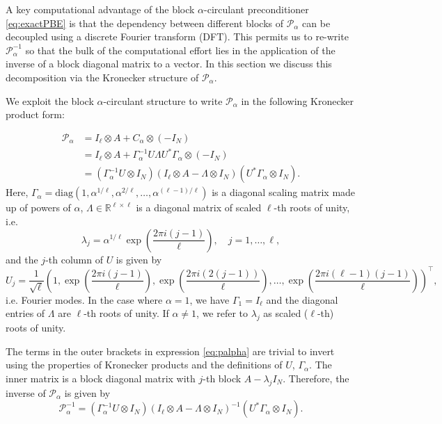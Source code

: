 \documentclass{article}
\newcommand{\sizeA}{N}
\theoremstyle{definition}
\begin{document}
	A key computational advantage of the block $\alpha$-circulant preconditioner \eqref{eq:exactPBE} is that the dependency between different blocks of $\mathcal{P}_\alpha$ can be decoupled using a discrete Fourier transform (DFT). This permits us to re-write $\mathcal{P}_\alpha^{-1}$ so that the bulk of the computational effort lies in the application of the inverse of a block diagonal matrix to a vector. In this section we discuss this decomposition via the Kronecker structure of $\mathcal{P}_\alpha$.
	
	We exploit the block {$\alpha$-}circulant structure to write $\mathcal{P}_{\alpha}$
	in the following Kronecker product form:
	{
		\begin{align}
			\nonumber
			\mathcal{P}_{\alpha} &= I_{\ell} \otimes {A} + C_{\alpha} \otimes(-I_\sizeA)\\
			\nonumber
			& = I_{\ell} \otimes {A} + \Gamma_{\alpha}^{-1}U\Lambda U^*\Gamma_{\alpha} \otimes(-I_\sizeA)\\
			& = (\Gamma_{\alpha}^{-1}U\otimes I_\sizeA) (I_{\ell}\otimes {A} - \Lambda \otimes I_\sizeA)(U^*\Gamma_{\alpha}\otimes I_\sizeA).
			\label{eq:palpha}
		\end{align}
		Here, $\Gamma_{\alpha} = \textrm{diag}(1,\alpha^{1/\ell},\alpha^{2/\ell},\dots,\alpha^{(\ell-1)/\ell})$ is a diagonal scaling matrix made up of powers of $\alpha$, $\Lambda \in \mathbb{R}^{\ell\times \ell}$ is a diagonal matrix of scaled {$\ell$-th} roots of unity, i.e. 
		\begin{equation*}
			\lambda_j = \alpha^{1/\ell}\exp \left(\frac{2\pi i (j-1)}{\ell}\right), {\quad j=1, \ldots, \ell},
		\end{equation*}
		and the $j$-th column of $U$ is given by 
		$$U_j = \frac{1}{\sqrt{\ell}}\left(1,\exp\left(\frac{2\pi i(j-1)}{\ell}\right), \exp\left(\frac{2\pi i(2(j-1))}{\ell}\right),\dots,\exp\left(\frac{2\pi i(\ell-1)(j-1)}{\ell}\right)\right)^{\top},$$
		i.e. Fourier modes.  In the case where $\alpha=1$, we have $\Gamma_1=I_{\ell}$ and the diagonal entries of $\Lambda$ are {$\ell$-th} roots of unity. If $\alpha\ne1$, we refer to $\lambda_j$ as scaled ({$\ell$-th}) roots of unity.
		
		
		
		The terms in the outer brackets in expression \eqref{eq:palpha} are trivial to invert using the properties of Kronecker products and the definitions of $U$, $\Gamma_{\alpha}$.
		The inner matrix is a block diagonal matrix with $j$-th block ${A}-\lambda_j I_\sizeA$. Therefore, the inverse of $\mathcal{P}_{\alpha}$ is given by
		\begin{equation}\label{eq:Paform}
			\mathcal{P}_{\alpha}^{-1} =(\Gamma_{\alpha}^{-1}U\otimes I_\sizeA) (I_{\ell}\otimes {A} - \Lambda \otimes I_\sizeA)^{-1}(U^*\Gamma_{\alpha}\otimes I_\sizeA).
		\end{equation}
		
}
\end{document}
